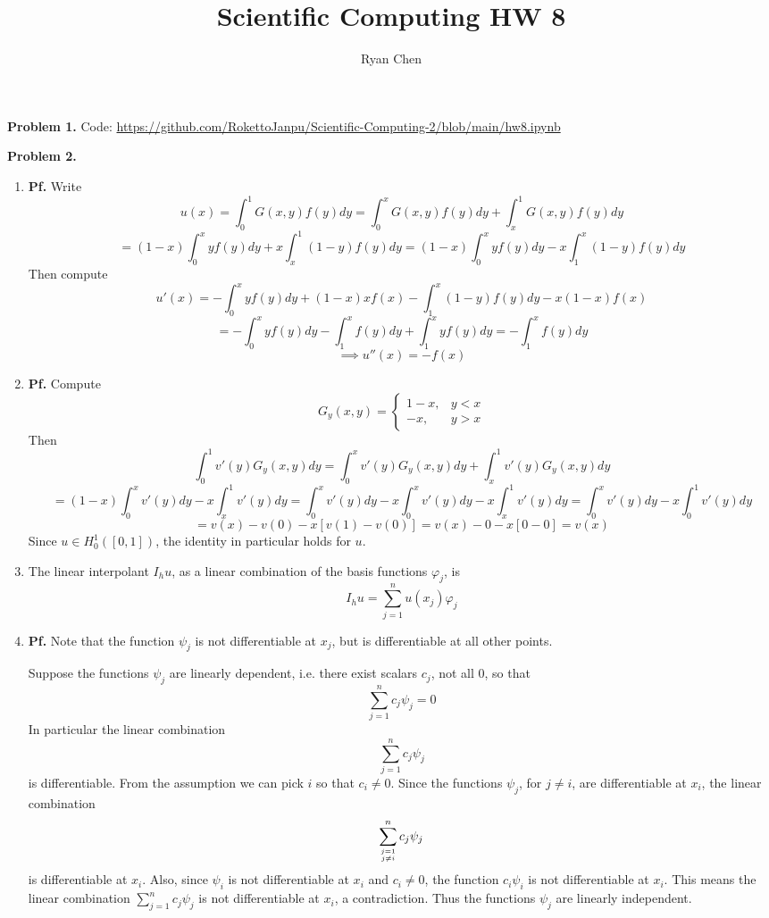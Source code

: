 \documentclass{article}
\title{Scientific Computing HW 8}
\author{Ryan Chen}
\def\tbf#1{\textbf{#1}}
\newcommand{\vp}{\varphi}
\newcommand{\pf}{\tbf{Pf. }}
\newcommand{\imp}{\implies}
\begin{document}
	
\maketitle



\tbf{Problem 1.} Code: \url{https://github.com/RokettoJanpu/Scientific-Computing-2/blob/main/hw8.ipynb}



\tbf{Problem 2.}

\begin{enumerate}[label=(\alph*)]
	
\item \pf Write
$$u(x) = \int_0^1 G(x,y)f(y)dy
= \int_0^x G(x,y)f(y)dy + \int_x^1 G(x,y)f(y)dy$$
$$= (1-x)\int_0^x yf(y)dy + x\int_x^1 (1-y)f(y)dy
= (1-x)\int_0^x yf(y)dy - x\int_1^x (1-y)f(y)dy$$
Then compute
$$u'(x) = -\int_0^x yf(y)dy + (1-x)xf(x) - \int_1^x (1-y)f(y)dy - x(1-x)f(x)$$
$$= -\int_0^x yf(y)dy - \int_1^x f(y)dy + \int_1^x yf(y)dy
= -\int_1^x f(y)dy$$
$$\imp u''(x) = -f(x)$$


\item \pf Compute
$$G_y(x,y) =
\begin{cases}
	1-x, & y<x\\
	-x, & y>x
\end{cases}$$
Then
$$\int_0^1 v'(y)G_y(x,y)dy = \int_0^x v'(y)G_y(x,y)dy + \int_x^1 v'(y)G_y(x,y)dy$$
$$= (1-x)\int_0^x v'(y)dy - x\int_x^1 v'(y)dy
= \int_0^x v'(y)dy - x\int_0^x v'(y)dy - x\int_x^1 v'(y)dy
= \int_0^x v'(y)dy - x\int_0^1 v'(y)dy$$
$$= v(x) - v(0) - x[v(1) - v(0)]
= v(x) - 0 - x[0 - 0]
= v(x)$$
Since $u\in H^1_0([0,1])$, the identity in particular holds for $u$.


\item The linear interpolant $I_hu$, as a linear combination of the basis functions $\vp_j$, is
$$I_hu = \sum_{j=1}^n u(x_j)\vp_j$$


\item \pf Note that the function $\psi_j$ is not differentiable at $x_j$, but is differentiable at all other points.

Suppose the functions $\psi_j$ are linearly dependent, i.e. there exist scalars $c_j$, not all 0, so that
$$\sum_{j=1}^nc_j\psi_j=0$$
In particular the linear combination
$$\sum_{j=1}^nc_j\psi_j$$
is differentiable. From the assumption we can pick $i$ so that $c_i\ne0$. Since the functions $\psi_j$, for $j\ne i$, are differentiable at $x_i$, the linear combination
$$\sum_{j=1 \atop j\ne i}^n c_j\psi_j$$
is differentiable at $x_i$. Also, since $\psi_i$ is not differentiable at $x_i$ and $c_i\ne0$, the function $c_i\psi_i$ is not differentiable at $x_i$. This means the linear combination $\sum_{j=1}^nc_j\psi_j$ is not differentiable at $x_i$, a contradiction. Thus the functions $\psi_j$ are linearly independent.


\end{enumerate}
\end{document}
